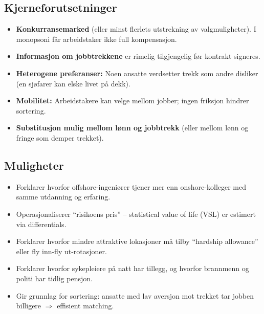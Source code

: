 \subsection*{Kjerneforutsetninger}
\begin{itemize}
\item \textbf{Konkurransemarked} (eller minst flerlets utstrekning av valgmuligheter). I monopsoni får arbeidstaker ikke full kompensasjon.
\item \textbf{Informasjon om jobbtrekkene} er rimelig tilgjengelig før kontrakt signeres.
\item \textbf{Heterogene preferanser:} Noen ansatte verdsetter trekk som andre disliker (en sjøfarer kan elske livet på dekk).
\item \textbf{Mobilitet:} Arbeidstakere kan velge mellom jobber; ingen friksjon hindrer sortering.
\item \textbf{Substitusjon mulig mellom lønn og jobbtrekk} (eller mellom lønn og fringe som demper trekket).
\end{itemize}

\subsection*{Muligheter}
\begin{itemize}
\item Forklarer hvorfor offshore-ingeniører tjener mer enn onshore-kolleger med samme utdanning og erfaring.
\item Operasjonaliserer ``risikoens pris'' -- statistical value of life (VSL) er estimert via differentials.
\item Forklarer hvorfor mindre attraktive lokasjoner må tilby ``hardship allowance'' eller fly inn-fly ut-rotasjoner.
\item Forklarer hvorfor sykepleiere på natt har tillegg, og hvorfor brannmenn og politi har tidlig pensjon.
\item Gir grunnlag for sortering: ansatte med lav aversjon mot trekket tar jobben billigere $\Rightarrow$ effisient matching.
\end{itemize}

